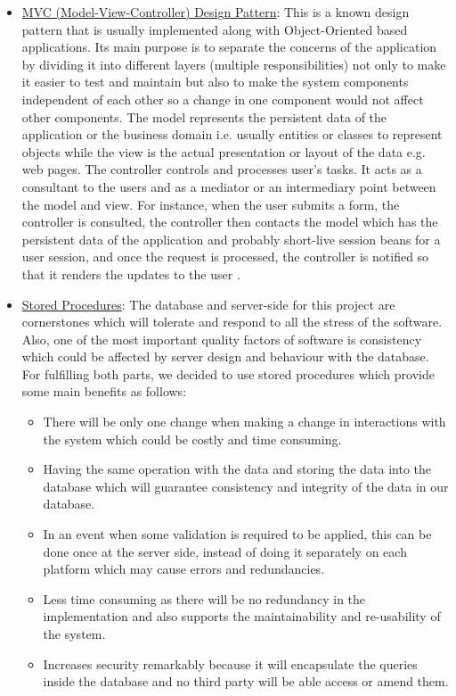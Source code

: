 \documentclass{article}
\begin{document}
\begin{itemize}
\item \underline{MVC (Model-View-Controller) Design Pattern}: This is a known design pattern that is usually implemented along with Object-Oriented based applications. Its main purpose is to separate the concerns of the application by dividing it into different layers (multiple responsibilities) not only to make it easier to test and maintain but also to make the system components independent of each other so a change in one component would not affect other components. The model represents the persistent data of the application or the business domain i.e. usually entities or classes to represent objects while the view is the actual presentation or layout of the data e.g. web pages. The controller controls and processes user’s tasks. It acts as a consultant to the users and as a mediator or an intermediary point between the model and view. For instance, when the user submits a form, the controller is consulted, the controller then contacts the model which has the persistent data of the application and probably short-live session beans for a user session, and once the request is processed, the controller is notified so that it renders the updates to the user \cite{tutorialspoint}. 

\item \underline{Stored Procedures}:
The database and server-side for this project are cornerstones which will tolerate and respond to all the stress of the software. Also, one of the most important quality factors of software is consistency which could be affected by server design and behaviour with the database. For fulfilling both parts, we decided to use stored procedures which provide some main benefits as follows: \par
\begin{itemize}
\item There will be only one change when making a change in interactions with the system which could be costly and time consuming.
\item Having the same operation with the data and storing the data into the database which will guarantee consistency and integrity of the data in our database.
\item In an event when some validation is required to be applied, this can be done once at the server side, instead of doing it separately on each platform which may cause errors and redundancies. 
\item Less time consuming as there will be no redundancy in the implementation and also supports the maintainability and re-usability of the system.
\item Increases security remarkably because it will encapsulate the queries inside the database and no third party will be able access or amend them.
\end{itemize}
\end{itemize}
\end{document}
